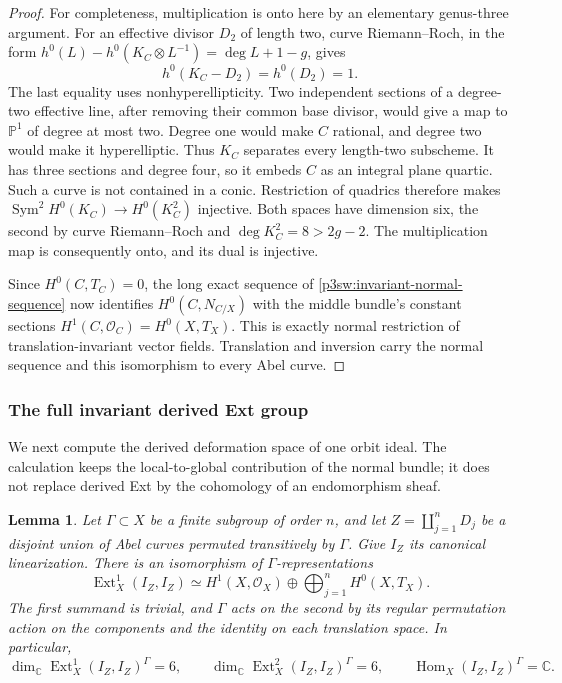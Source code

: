 \documentclass[11pt]{article}
\newtheorem{lemma}[theorem]{Lemma}
\numberwithin{equation}{section}
\begin{document}
\begin{proof}
For completeness, multiplication is onto here by an elementary
genus-three argument.  For an effective divisor \(D_2\) of length two,
curve Riemann--Roch, in the form
\(h^0(L)-h^0(K_C\otimes L^{-1})=\deg L+1-g\), gives
\[
 h^0(K_C-D_2)=h^0(D_2)=1.
\]
The last equality uses nonhyperellipticity.  Two independent sections
of a degree-two effective line, after removing their common base divisor,
would give a map to \(\mathbb P^1\) of degree at most two.  Degree one
would make \(C\) rational, and degree two would make it hyperelliptic.
Thus \(K_C\) separates every length-two subscheme.  It has three
sections and degree four, so it embeds \(C\) as an integral plane
quartic.  Such a curve is not contained in a conic.  Restriction of
quadrics therefore makes
\(\operatorname{Sym}^2H^0(K_C)\to H^0(K_C^2)\) injective.  Both spaces
have dimension six, the second by curve Riemann--Roch and
\(\deg K_C^2=8>2g-2\).  The multiplication map is consequently onto,
and its dual is injective.

Since \(H^0(C,T_C)=0\), the long exact sequence of
\eqref{p3sw:invariant-normal-sequence} now identifies
\(H^0(C,N_{C/X})\) with the middle bundle's constant sections
\(H^1(C,\mathcal O_C)=H^0(X,T_X)\).  This is exactly normal restriction
of translation-invariant vector fields.  Translation and inversion
carry the normal sequence and this isomorphism to every Abel curve.
\end{proof}

\subsubsection{The full invariant derived Ext group}

We next compute the derived deformation space of one orbit ideal.
The calculation keeps the local-to-global contribution of the normal
bundle; it does not replace derived Ext by the cohomology of an
endomorphism sheaf.

\begin{lemma}\label{p3sw:invariant-orbit-ext}
Let \(\Gamma\subset X\) be a finite subgroup of order \(n\), and let
\(Z=\coprod_{j=1}^nD_j\) be a disjoint union of Abel curves permuted
transitively by \(\Gamma\).  Give \(I_Z\) its canonical linearization.
There is an isomorphism of \(\Gamma\)-representations
\begin{equation}\label{p3sw:invariant-orbit-representation}
 \operatorname{Ext}^1_X(I_Z,I_Z)
 \simeq H^1(X,\mathcal O_X)
       \oplus\bigoplus_{j=1}^n H^0(X,T_X).
\end{equation}
The first summand is trivial, and \(\Gamma\) acts on the second by
its regular permutation action on the components and the identity on
each translation space.  In particular,
\[
 \dim_{\mathbb C}\operatorname{Ext}^1_X(I_Z,I_Z)^\Gamma=6,\qquad
 \dim_{\mathbb C}\operatorname{Ext}^2_X(I_Z,I_Z)^\Gamma=6,\qquad
 \operatorname{Hom}_X(I_Z,I_Z)^\Gamma=\mathbb C.
\]
\end{lemma}
\end{document}
